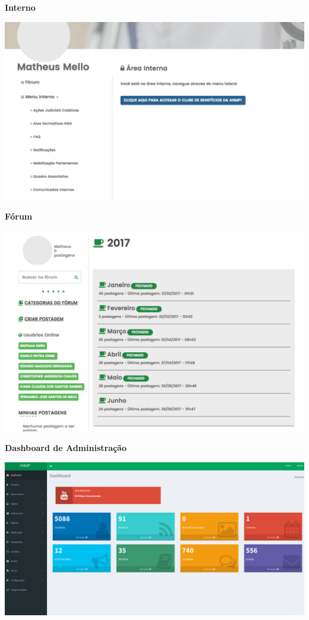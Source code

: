 \textbf{Interno}

\includegraphics[keepaspectratio=true,scale=0.3]{figuras/interno.png}

\textbf{Fórum}

\includegraphics[keepaspectratio=true,scale=0.3]{figuras/forum.png}

\textbf{Dashboard de Administração}

\includegraphics[keepaspectratio=true,scale=0.3]{figuras/admin.png}

